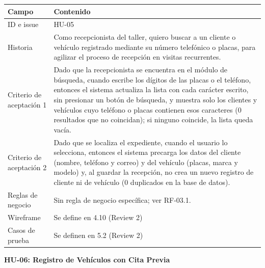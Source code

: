 {\def\LTcaptype{none} %
\begin{longtable}[]{@{}
  >{\raggedright\arraybackslash}p{}
  >{\raggedright\arraybackslash}p{}@{}}
\toprule\noalign{}
\begin{minipage}[b]{\linewidth}\raggedright
\textbf{Campo}
\end{minipage} & \begin{minipage}[b]{\linewidth}\raggedright
\textbf{Contenido}
\end{minipage} \\
\midrule\noalign{}
\endhead
\bottomrule\noalign{}
\endlastfoot
ID e issue & HU-05 \\
Historia & Como recepcionista del taller, quiero buscar a un cliente o
vehículo registrado mediante su número telefónico o placas, para
agilizar el proceso de recepción en visitas recurrentes. \\
Criterio de aceptación 1 & Dado que la recepcionista se encuentra en el
módulo de búsqueda, cuando escribe los dígitos de las placas o el
teléfono, entonces el sistema actualiza la lista con cada carácter
escrito, sin presionar un botón de búsqueda, y muestra solo los
clientes y vehículos cuyo teléfono o placas contienen esos caracteres
(0 resultados que no coincidan); si ninguno coincide, la lista queda
vacía. \\
Criterio de aceptación 2 & Dado que se localiza el expediente, cuando el
usuario lo selecciona, entonces el sistema precarga los datos del
cliente (nombre, teléfono y correo) y del vehículo (placas, marca y
modelo) y, al guardar la recepción, no crea un nuevo registro de
cliente ni de vehículo (0 duplicados en la base de datos). \\
Reglas de negocio & Sin regla de negocio específica; ver RF-03.1. \\
Wireframe & Se define en 4.10 (Review 2) \\
Casos de prueba & Se definen en 5.2 (Review 2) \\
\end{longtable}
}

\textbf{HU-06: Registro de Vehículos con Cita Previa}

